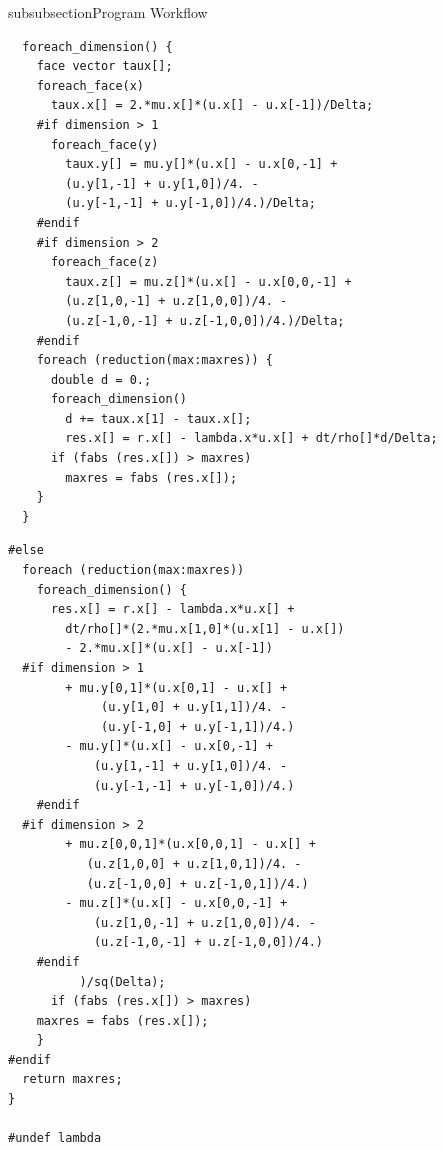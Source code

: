 \begin{codesection}{subsubsection}{Program Workflow}
\begin{verbatim}
  foreach_dimension() {
    face vector taux[];
    foreach_face(x)
      taux.x[] = 2.*mu.x[]*(u.x[] - u.x[-1])/Delta;
    #if dimension > 1
      foreach_face(y)
        taux.y[] = mu.y[]*(u.x[] - u.x[0,-1] + 
        (u.y[1,-1] + u.y[1,0])/4. -
        (u.y[-1,-1] + u.y[-1,0])/4.)/Delta;
    #endif
    #if dimension > 2
      foreach_face(z)
        taux.z[] = mu.z[]*(u.x[] - u.x[0,0,-1] + 
        (u.z[1,0,-1] + u.z[1,0,0])/4. -
        (u.z[-1,0,-1] + u.z[-1,0,0])/4.)/Delta;
    #endif
    foreach (reduction(max:maxres)) {
      double d = 0.;
      foreach_dimension()
        d += taux.x[1] - taux.x[];
        res.x[] = r.x[] - lambda.x*u.x[] + dt/rho[]*d/Delta;
      if (fabs (res.x[]) > maxres)
        maxres = fabs (res.x[]);
    }
  }
\end{verbatim}
\codearrow
{}
\begin{verbatim}
#else
  foreach (reduction(max:maxres))
    foreach_dimension() {
      res.x[] = r.x[] - lambda.x*u.x[] +
        dt/rho[]*(2.*mu.x[1,0]*(u.x[1] - u.x[])
        - 2.*mu.x[]*(u.x[] - u.x[-1])
  #if dimension > 1
        + mu.y[0,1]*(u.x[0,1] - u.x[] +
             (u.y[1,0] + u.y[1,1])/4. -
             (u.y[-1,0] + u.y[-1,1])/4.)
        - mu.y[]*(u.x[] - u.x[0,-1] +
            (u.y[1,-1] + u.y[1,0])/4. -
            (u.y[-1,-1] + u.y[-1,0])/4.)
	#endif
  #if dimension > 2
        + mu.z[0,0,1]*(u.x[0,0,1] - u.x[] +
           (u.z[1,0,0] + u.z[1,0,1])/4. -
           (u.z[-1,0,0] + u.z[-1,0,1])/4.)
        - mu.z[]*(u.x[] - u.x[0,0,-1] +
            (u.z[1,0,-1] + u.z[1,0,0])/4. -
            (u.z[-1,0,-1] + u.z[-1,0,0])/4.)
	#endif
		  )/sq(Delta);
      if (fabs (res.x[]) > maxres)
	maxres = fabs (res.x[]);
    }
#endif
  return maxres;
}

#undef lambda
\end{verbatim}
\end{codesection}

\subsection{}
